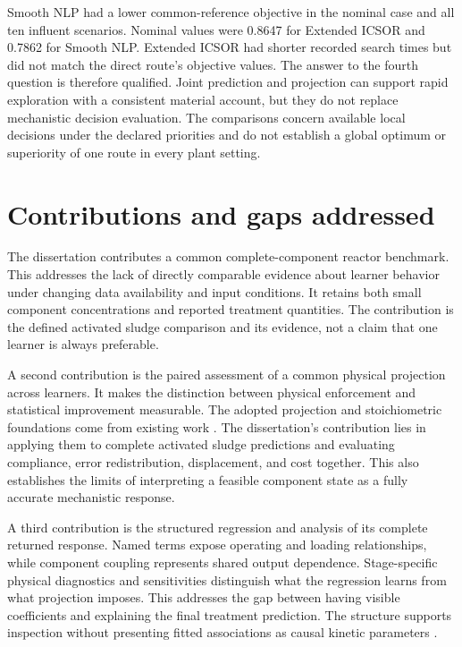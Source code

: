 Smooth NLP had a lower common-reference objective in the nominal case and all ten influent scenarios. Nominal values were 0.8647 for Extended ICSOR and 0.7862 for Smooth NLP. Extended ICSOR had shorter recorded search times but did not match the direct route's objective values. The answer to the fourth question is therefore qualified. Joint prediction and projection can support rapid exploration with a consistent material account, but they do not replace mechanistic decision evaluation. The comparisons concern available local decisions under the declared priorities and do not establish a global optimum or superiority of one route in every plant setting.

\section{Contributions and gaps addressed}
\label{sec:assessment_conclusions}

The dissertation contributes a common complete-component reactor benchmark. This addresses the lack of directly comparable evidence about learner behavior under changing data availability and input conditions. It retains both small component concentrations and reported treatment quantities. The contribution is the defined activated sludge comparison and its evidence, not a claim that one learner is always preferable.

A second contribution is the paired assessment of a common physical projection across learners. It makes the distinction between physical enforcement and statistical improvement measurable. The adopted projection and stoichiometric foundations come from existing work \citep{SturmWexler2022,KircherVotsmeier2025}. The dissertation's contribution lies in applying them to complete activated sludge predictions and evaluating compliance, error redistribution, displacement, and cost together. This also establishes the limits of interpreting a feasible component state as a fully accurate mechanistic response.

A third contribution is the structured regression and analysis of its complete returned response. Named terms expose operating and loading relationships, while component coupling represents shared output dependence. Stage-specific physical diagnostics and sensitivities distinguish what the regression learns from what projection imposes. This addresses the gap between having visible coefficients and explaining the final treatment prediction. The structure supports inspection without presenting fitted associations as causal kinetic parameters \citep{Selerio2026}.

